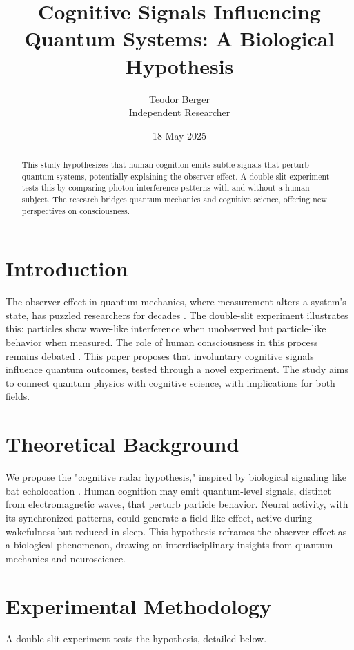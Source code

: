 \documentclass[12pt]{article}
\title{Cognitive Signals Influencing Quantum Systems: A Biological Hypothesis}
\author{Teodor Berger \\ Independent Researcher}
\date{18 May 2025}
\begin{document}
\maketitle

\begin{abstract}
This study hypothesizes that human cognition emits subtle signals that perturb quantum systems, potentially explaining the observer effect. A double-slit experiment tests this by comparing photon interference patterns with and without a human subject. The research bridges quantum mechanics and cognitive science, offering new perspectives on consciousness.
\end{abstract}

\section{Introduction}
The observer effect in quantum mechanics, where measurement alters a system's state, has puzzled researchers for decades \cite{wheeler1978law}. The double-slit experiment illustrates this: particles show wave-like interference when unobserved but particle-like behavior when measured. The role of human consciousness in this process remains debated \cite{zeilinger1999foundations}. This paper proposes that involuntary cognitive signals influence quantum outcomes, tested through a novel experiment. The study aims to connect quantum physics with cognitive science, with implications for both fields.

\section{Theoretical Background}
We propose the "cognitive radar hypothesis," inspired by biological signaling like bat echolocation \cite{penrose1989emperors}. Human cognition may emit quantum-level signals, distinct from electromagnetic waves, that perturb particle behavior. Neural activity, with its synchronized patterns, could generate a field-like effect, active during wakefulness but reduced in sleep. This hypothesis reframes the observer effect as a biological phenomenon, drawing on interdisciplinary insights from quantum mechanics and neuroscience.

\section{Experimental Methodology}
A double-slit experiment tests the hypothesis, detailed below.
\end{document}
